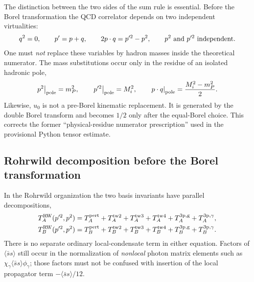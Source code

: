 \documentclass[11pt]{article}
\begin{document}
The distinction between the two sides of the sum rule is essential.  Before
the Borel transformation the QCD correlator depends on two independent
virtualities:
\begin{equation}
 q^2=0,\qquad p^{\prime}=p+q,\qquad
 2p\cdot q=p^{\prime2}-p^2,\qquad
 p^2\ \hbox{and}\ p^{\prime2}\ \hbox{independent}.
 \label{eq:qcd-offshell-kinematics}
\end{equation}
One must \emph{not} replace these variables by hadron masses inside the
theoretical numerator.  The mass substitutions occur only in the residue of
an isolated hadronic pole,
\begin{equation}
 \left.p^2\right|_{\rm pole}=m_P^2,\qquad
 \left.p^{\prime2}\right|_{\rm pole}=M_i^2,\qquad
 \left.p\cdot q\right|_{\rm pole}=\frac{M_i^2-m_P^2}{2}.
 \label{eq:hadronic-pole-kinematics}
\end{equation}
Likewise, $u_0$ is not a pre-Borel kinematic replacement.  It is generated by
the double Borel transform and becomes $1/2$ only after the equal-Borel choice.
This corrects the former ``physical-residue numerator prescription'' used in
the provisional Python tensor estimate.

\subsection{Rohrwild decomposition before the Borel transformation}

In the Rohrwild organization the two basis invariants have parallel
decompositions,
\begin{align}
 T_A^{\rm RW}(p^{\prime2},p^2)
 &=
 T_A^{\rm pert}+T_A^{\rm tw2}+T_A^{\rm tw3}+T_A^{\rm tw4}
 +T_A^{\rm 3p,g}+T_A^{\rm 3p,\gamma},
 \label{eq:TA-preborel-decomposition}\\
 T_B^{\rm RW}(p^{\prime2},p^2)
 &=
 T_B^{\rm pert}+T_B^{\rm tw2}+T_B^{\rm tw3}+T_B^{\rm tw4}
 +T_B^{\rm 3p,g}+T_B^{\rm 3p,\gamma}.
 \label{eq:TB-preborel-decomposition}
\end{align}
There is no separate ordinary local-condensate term in either equation.
Factors of $\langle\bar ss\rangle$ still occur in the normalization of
\emph{nonlocal} photon matrix elements such as
$\chi_\gamma\langle\bar ss\rangle\phi_\gamma$; those factors must not be
confused with insertion of the local propagator term
$-\langle\bar ss\rangle/12$.
\end{document}
